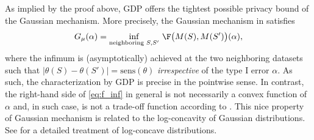 As implied by the proof above, GDP offers the tightest possible privacy bound of the Gaussian mechanism. More precisely, the Gaussian mechanism in  satisfies
\begin{equation}\label{eq:f_inf}
G_{\mu}(\alpha) = \inf_{\text{neighboring }S, S'} \, \F \big(M(S),M(S') \big)(\alpha),
\end{equation}
where the infimum is (asymptotically) achieved at the two neighboring datasets such that $|\theta(S) - \theta(S')| = \mathrm{sens}(\theta)$ \textit{irrespective} of the type I error $\alpha$. As such, the characterization by GDP is precise in the pointwise sense. In contrast, the right-hand side of \eqref{eq:f_inf} in general is not necessarily a convex function of $\alpha$ and, in such case, is not a trade-off function according to . This nice property of Gaussian mechanism is related to the log-concavity of Gaussian distributions. See  for a detailed treatment of log-concave distributions.


